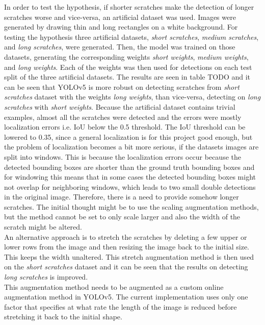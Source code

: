 In order to test the hypothesis, if shorter scratches make the detection of longer scratches worse and vice-versa, an artificial dataset was used. Images were generated by drawing thin and long rectangles on a white background. For testing the hypothesis three artificial datasets, \textit{short scratches}, \textit{medium scratches}, and \textit{long scratches}, were generated. Then, the model was trained on those datasets, generating the corresponding weights \textit{short weights}, \textit{medium weights}, and \textit{long weights}. Each of the weights was then used for detections on each test split of the three artificial datasets. The results are seen in table TODO and it can be seen that YOLOv5 is more robust on detecting scratches from \textit{short scratches} dataset with the weights \textit{long weights}, than vice-versa, detecting on \textit{long scratches} with \textit{short weights}. Because the artificial dataset contains trivial examples, almost all the scratches were detected and the errors were mostly localization errors i.e. IoU below the 0.5 threshold. The IoU threshold can be lowered to 0.35, since a general localization is for this project good enough, but the problem of localization becomes a bit more serious, if the datasets images are split into windows. This is because the localization errors occur because the detected bounding boxes are shorter than the ground truth bounding boxes and for windowing this means that in some cases the detected bounding boxes might not overlap for neighboring windows, which leads to two small double detections in the original image. Therefore, there is a need to provide somehow longer scratches. The initial thought might be to use the scaling augmentation methods, but the method cannot be set to only scale larger and also the width of the scratch might be altered. \\
An alternative approach is to stretch the scratches by deleting a few upper or lower rows from the image and then resizing the image back to the initial size. This keeps the width unaltered. This stretch augmentation method is then used on the \textit{short scratches} dataset and it can be seen that the results on detecting \textit{long scratches} is improved. \\
This augmentation method needs to be augmented as a custom online augmentation method in YOLOv5. The current implementation uses only one factor that specifies at what rate the length of the image is reduced before stretching it back to the initial shape. \\

